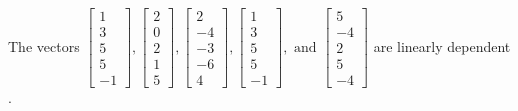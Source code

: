 \begin{exercise}
\begin{exerciseStatement}
  \end{exerciseStatement}
  \begin{exerciseAnswer}
   The vectors \(\left[\begin{array}{r}
1 \\
3 \\
5 \\
5 \\
-1
\end{array}\right] , \left[\begin{array}{r}
2 \\
0 \\
2 \\
1 \\
5
\end{array}\right] , \left[\begin{array}{r}
2 \\
-4 \\
-3 \\
-6 \\
4
\end{array}\right] , \left[\begin{array}{r}
1 \\
3 \\
5 \\
5 \\
-1
\end{array}\right] , \text{ and } \left[\begin{array}{r}
5 \\
-4 \\
2 \\
5 \\
-4
\end{array}\right]\) are 
  	 linearly dependent  .
  


  \end{exerciseAnswer}
\end{exercise}